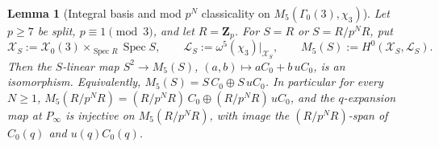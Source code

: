 \documentclass[11pt]{amsart}
\newtheorem{lemma}[theorem]{Lemma}
\theoremstyle{definition}
\theoremstyle{remark}
\newcommand{\Z}{\mathbf{Z}}
\begin{document}
\begin{lemma}[Integral basis and mod $p^N$ classicality on $M_5(\Gamma_0(3),\chi_3)$]\label{lem:M5-integral-mod-pN}
Let $p\ge 7$ be split, $p\equiv 1\pmod 3$, and let $R=\Z_p$. For $S=R$ or $S=R/p^N R$, put
\[
\mathcal X_S:=\mathcal X_0(3)\times_{\operatorname{Spec} R}\operatorname{Spec} S,\qquad \mathcal L_S:=\omega^5(\chi_3)|_{\mathcal X_S},\qquad M_5(S):=H^0(\mathcal X_S,\mathcal L_S).
\]
Then the $S$-linear map $S^2\to M_5(S)$, $(a,b)\mapsto aC_0+b\,uC_0$, is an isomorphism. Equivalently, $M_5(S)=S\,C_0\oplus S\,uC_0$. In particular for every $N\ge 1$, $M_5(R/p^N R)=(R/p^N R)\,C_0\oplus(R/p^N R)\,uC_0$, and the $q$-expansion map at $P_\infty$ is injective on $M_5(R/p^N R)$, with image the $(R/p^N R)$-span of $C_0(q)$ and $u(q)C_0(q)$.
\end{lemma}
\end{document}
